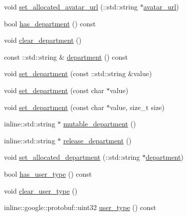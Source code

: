 \begin{DoxyCompactItemize}
\item 
void \hyperlink{class_i_m_1_1_base_define_1_1_server_user_info_a933862c56a0e62ec8e95d7d71fdb89a4}{set\+\_\+allocated\+\_\+avatar\+\_\+url} (\+::std\+::string $\ast$\hyperlink{class_i_m_1_1_base_define_1_1_server_user_info_af935bca8e0fcfc75e5890f5299464f83}{avatar\+\_\+url})
\item 
bool \hyperlink{class_i_m_1_1_base_define_1_1_server_user_info_aab44fa59516f82954eb0811fd056ceb7}{has\+\_\+department} () const 
\item 
void \hyperlink{class_i_m_1_1_base_define_1_1_server_user_info_aba65b922fc582684133edab5809a1250}{clear\+\_\+department} ()
\item 
const \+::std\+::string \& \hyperlink{class_i_m_1_1_base_define_1_1_server_user_info_a7bc2654747d5e1c67ca33fa7b7379033}{department} () const 
\item 
void \hyperlink{class_i_m_1_1_base_define_1_1_server_user_info_aa8c5b49adc7a27fe05e88df772ce9ac1}{set\+\_\+department} (const \+::std\+::string \&value)
\item 
void \hyperlink{class_i_m_1_1_base_define_1_1_server_user_info_a9f1a6340d9dd26ae8f94e9822bc3e592}{set\+\_\+department} (const char $\ast$value)
\item 
void \hyperlink{class_i_m_1_1_base_define_1_1_server_user_info_ac67b304254601b79ce9ed8959a69e327}{set\+\_\+department} (const char $\ast$value, size\+\_\+t size)
\item 
inline\+::std\+::string $\ast$ \hyperlink{class_i_m_1_1_base_define_1_1_server_user_info_a322b45fd51bb5dd451805ae5d9549d7d}{mutable\+\_\+department} ()
\item 
inline\+::std\+::string $\ast$ \hyperlink{class_i_m_1_1_base_define_1_1_server_user_info_a311b6b83dede38580572b4a261024f6c}{release\+\_\+department} ()
\item 
void \hyperlink{class_i_m_1_1_base_define_1_1_server_user_info_a0973405bd86f1a3e104ba11595835971}{set\+\_\+allocated\+\_\+department} (\+::std\+::string $\ast$\hyperlink{class_i_m_1_1_base_define_1_1_server_user_info_a7bc2654747d5e1c67ca33fa7b7379033}{department})
\item 
bool \hyperlink{class_i_m_1_1_base_define_1_1_server_user_info_a94604886c71bdf6619e253eafdb9ba1b}{has\+\_\+user\+\_\+type} () const 
\item 
void \hyperlink{class_i_m_1_1_base_define_1_1_server_user_info_af7122ec5677daa0e02acbcb1a8d9a6c2}{clear\+\_\+user\+\_\+type} ()
\item 
inline\+::google\+::protobuf\+::uint32 \hyperlink{class_i_m_1_1_base_define_1_1_server_user_info_aaedb21e6d9491b04f70699a5980f335c}{user\+\_\+type} () const 

\end{DoxyCompactItemize}
